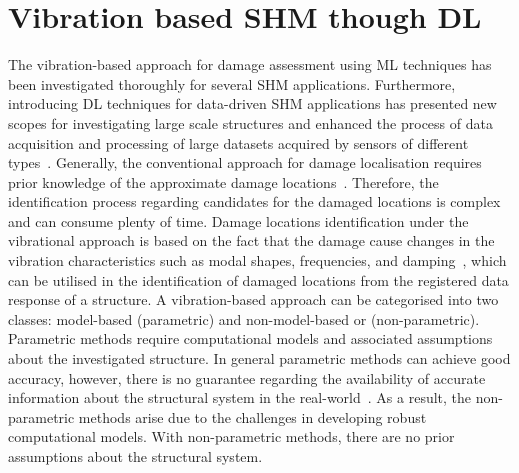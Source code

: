 \section{Vibration based SHM though DL}
The vibration-based approach for damage assessment using ML techniques has been investigated thoroughly  for several SHM applications.
Furthermore, introducing DL techniques for data-driven SHM applications has presented new scopes for investigating large scale structures and enhanced the process of data acquisition and processing of large datasets acquired by sensors of different types~\cite{Carden2004,Sohn1996}.
Generally, the conventional approach for damage localisation requires prior knowledge of the approximate damage locations~\cite{Xu2018,Dorafshan2016}. 
Therefore, the identification process regarding candidates for the damaged locations is complex and can consume plenty of time.
Damage locations identification under the vibrational approach is based on the fact that the damage cause changes in the vibration characteristics such as modal shapes, frequencies, and damping~\cite{Doebling},
which can be utilised in the identification of damaged locations from the registered data response of a structure.
A vibration-based approach can be categorised into two classes:
model-based (parametric) and non-model-based or (non-parametric).
Parametric methods require computational models and associated assumptions about the investigated structure.
In general parametric methods can achieve good accuracy, however, there is no guarantee regarding the availability of accurate information about the structural system in the real-world~\cite{Azimi2020}. 
As a result, the non-parametric methods arise due to the challenges in developing robust computational models. 
With non-parametric methods, there are no prior assumptions about the structural system.

